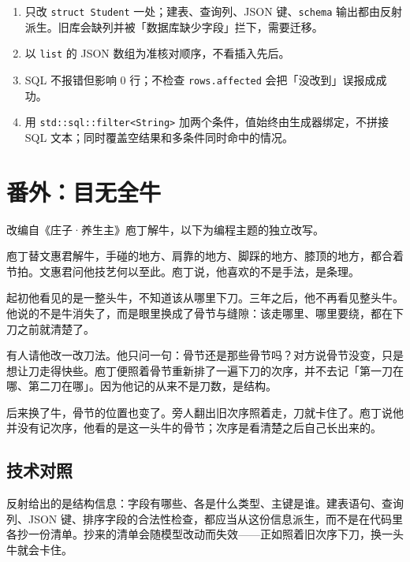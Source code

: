 \begin{enumerate}

\item 只改 \texttt{struct Student} 一处；建表、查询列、JSON 键、\texttt{schema} 输出都由反射派生。旧库会缺列并被「数据库缺少字段」拦下，需要迁移。

\item 以 \texttt{list} 的 JSON 数组为准核对顺序，不看插入先后。

\item SQL 不报错但影响 0 行；不检查 \texttt{rows.\allowbreak{}affected} 会把「没改到」误报成成功。

\item 用 \texttt{std:\allowbreak{}:\allowbreak{}sql:\allowbreak{}:\allowbreak{}filter<\allowbreak{}String>\allowbreak{}} 加两个条件，值始终由生成器绑定，不拼接 SQL 文本；同时覆盖空结果和多条件同时命中的情况。

\end{enumerate}

\section{番外：目无全牛}

改编自《庄子·养生主》庖丁解牛，以下为编程主题的独立改写。

庖丁替文惠君解牛，手碰的地方、肩靠的地方、脚踩的地方、膝顶的地方，都合着节拍。文惠君问他技艺何以至此。庖丁说，他喜欢的不是手法，是条理。

起初他看见的是一整头牛，不知道该从哪里下刀。三年之后，他不再看见整头牛。他说的不是牛消失了，而是眼里换成了骨节与缝隙：该走哪里、哪里要绕，都在下刀之前就清楚了。

有人请他改一改刀法。他只问一句：骨节还是那些骨节吗？对方说骨节没变，只是想让刀走得快些。庖丁便照着骨节重新排了一遍下刀的次序，并不去记「第一刀在哪、第二刀在哪」。因为他记的从来不是刀数，是结构。

后来换了牛，骨节的位置也变了。旁人翻出旧次序照着走，刀就卡住了。庖丁说他并没有记次序，他看的是这一头牛的骨节；次序是看清楚之后自己长出来的。

\subsection*{技术对照}

反射给出的是结构信息：字段有哪些、各是什么类型、主键是谁。建表语句、查询列、JSON 键、排序字段的合法性检查，都应当从这份信息派生，而不是在代码里各抄一份清单。抄来的清单会随模型改动而失效——正如照着旧次序下刀，换一头牛就会卡住。
